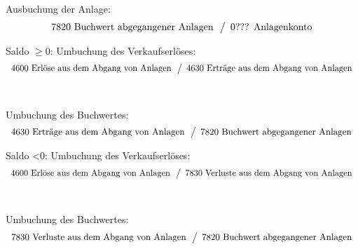 \documentclass[a4paper,9pt]{article}
\begin{document}
Ausbuchung der Anlage:
\begin{equation*}
  \begin{array}{l}
    \text{7820 Buchwert abgegangener Anlagen}\\
  \end{array}
  \left\slash
    \begin{array}{l}
      \text{0??? Anlagenkonto}\\
    \end{array}
  \right.
\end{equation*}

Saldo $\geq 0$:
Umbuchung des Verkaufserlöses:
\begin{equation*}
  \begin{array}{l}
    \text{4600 Erlöse aus dem Abgang von Anlagen}\\
  \end{array}
  \left\slash
    \begin{array}{l}
      \text{4630 Erträge aus dem Abgang von Anlagen}\\
    \end{array}
  \right.
\end{equation*}\\
\\
Umbuchung des Buchwertes:
\begin{equation*}
  \begin{array}{l}
    \text{4630 Erträge aus dem Abgang von Anlagen}\\
  \end{array}
  \left\slash
    \begin{array}{l}
      \text{7820 Buchwert abgegangener Anlagen}\\
    \end{array}
  \right.
\end{equation*}

Saldo <0:
Umbuchung des Verkaufserlöses:
\begin{equation*}
  \begin{array}{l}
    \text{4600 Erlöse aus dem Abgang von Anlagen}\\
  \end{array}
  \left\slash
    \begin{array}{l}
      \text{7830 Verluste aus dem Abgang von Anlagen}\\
    \end{array}
  \right.
\end{equation*}\\
\\
Umbuchung des Buchwertes:
\begin{equation*}
  \begin{array}{l}
    \text{7830 Verluste aus dem Abgang von Anlagen}\\
  \end{array}
  \left\slash
    \begin{array}{l}
      \text{7820 Buchwert abgegangener Anlagen}\\
    \end{array}
  \right.
\end{equation*}
\end{document}
